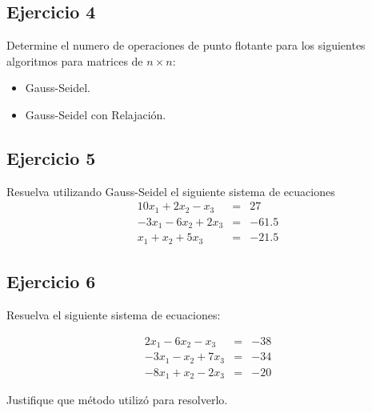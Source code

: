 \documentclass[a4paper,11pt]{article}
\theoremstyle{mytheor}
\begin{document}
\subsection*{Ejercicio 4}

Determine el numero de operaciones de punto flotante para los siguientes algoritmos para matrices de $n\times	n$:
\begin{itemize}
\item Gauss-Seidel.
\item Gauss-Seidel con Relajación.
\end{itemize}

\subsection*{Ejercicio 5}


Resuelva utilizando Gauss-Seidel el siguiente sistema de ecuaciones 
$$\begin{array}{ccc}
10x_1 +2x_2 - x_3 	&=& 27\\
-3x_1 -6x_2 + 2x_3 	&=& -61.5\\
x_1+x_2+ 5x_3 		&=& -21.5
\end{array}$$

\subsection*{Ejercicio 6}

Resuelva el siguiente sistema de ecuaciones:

$$\begin{array}{ccc}
2x_1 -6x_2 -x_3 &=& -38\\
-3x_1-x_2+7x_3 &=& -34\\
-8x_1 +x_2-2x_3 &=& -20
\end{array}$$

Justifique que método utilizó para resolverlo.
\end{document}
